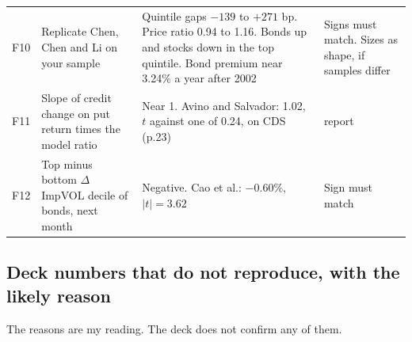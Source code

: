 \documentclass[10pt,a4paper]{article}
\begin{document}
{\begin{longtable}{@{}>{\raggedright\arraybackslash}p{0.75cm}>{\raggedright\arraybackslash}p{6.6cm}>{\raggedright\arraybackslash}p{4.2cm}>{\raggedright\arraybackslash}p{3.3cm}@{}}
F10 & Replicate Chen, Chen and Li on your sample & Quintile gaps $-139$ to $+271$ bp. Price ratio 0.94 to 1.16. Bonds up and stocks down in the top quintile. Bond premium near 3.24\% a year after 2002 & Signs must match. Sizes as shape, if samples differ\\
F11 & Slope of credit change on put return times the model ratio & Near 1. Avino and Salvador: 1.02, $t$ against one of 0.24, on CDS (p.23) & report\\
F12 & Top minus bottom $\Delta$ImpVOL decile of bonds, next month & Negative. Cao et al.: $-0.60\%$, $|t|=3.62$ & Sign must match\\
\end{longtable}}

\subsection*{Deck numbers that do not reproduce, with the likely reason}

The reasons are my reading. The deck does not confirm any of them.
\end{document}
